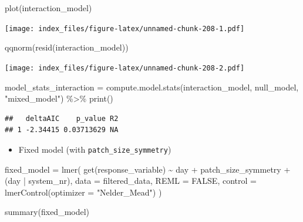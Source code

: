 \documentclass[
]{article}
\newenvironment{Shaded}{\begin{snugshade}}{\end{snugshade}}
\newcommand{\AttributeTok}[1]{\textcolor[rgb]{0.77,0.63,0.00}{#1}}
\newcommand{\ConstantTok}[1]{\textcolor[rgb]{0.00,0.00,0.00}{#1}}
\newcommand{\FunctionTok}[1]{\textcolor[rgb]{0.00,0.00,0.00}{#1}}
\newcommand{\NormalTok}[1]{#1}
\newcommand{\OtherTok}[1]{\textcolor[rgb]{0.56,0.35,0.01}{#1}}
\newcommand{\SpecialCharTok}[1]{\textcolor[rgb]{0.00,0.00,0.00}{#1}}
\newcommand{\StringTok}[1]{\textcolor[rgb]{0.31,0.60,0.02}{#1}}
\providecommand{\tightlist}{%
  \setlength{\itemsep}{0pt}\setlength{\parskip}{0pt}}
\begin{document}
\begin{Shaded}
\begin{Highlighting}[]
\FunctionTok{plot}\NormalTok{(interaction\_model)}
\end{Highlighting}
\end{Shaded}

\texttt{[image: index\_files/figure-latex/unnamed-chunk-208-1.pdf]}

\begin{Shaded}
\begin{Highlighting}[]
\FunctionTok{qqnorm}\NormalTok{(}\FunctionTok{resid}\NormalTok{(interaction\_model))}
\end{Highlighting}
\end{Shaded}

\texttt{[image: index\_files/figure-latex/unnamed-chunk-208-2.pdf]}

\begin{Shaded}
\begin{Highlighting}[]
\NormalTok{model\_stats\_interaction }\OtherTok{=} \FunctionTok{compute.model.stats}\NormalTok{(interaction\_model,}
\NormalTok{                                              null\_model,}
                                              \StringTok{"mixed\_model"}\NormalTok{) }\SpecialCharTok{\%\textgreater{}\%}
  \FunctionTok{print}\NormalTok{()}
\end{Highlighting}
\end{Shaded}

\begin{verbatim}
##   deltaAIC    p_value R2
## 1 -2.34415 0.03713629 NA
\end{verbatim}

\begin{itemize}
\tightlist
\item
  Fixed model (with \texttt{patch\_size\_symmetry})
\end{itemize}

\begin{Shaded}
\begin{Highlighting}[]
\NormalTok{fixed\_model }\OtherTok{=} \FunctionTok{lmer}\NormalTok{(}
  \FunctionTok{get}\NormalTok{(response\_variable) }\SpecialCharTok{\textasciitilde{}}
\NormalTok{    day }\SpecialCharTok{+} 
\NormalTok{    patch\_size\_symmetry }\SpecialCharTok{+} 
\NormalTok{    (day }\SpecialCharTok{|}\NormalTok{ system\_nr), }
  \AttributeTok{data =}\NormalTok{ filtered\_data,}
  \AttributeTok{REML =} \ConstantTok{FALSE}\NormalTok{,}
  \AttributeTok{control =} \FunctionTok{lmerControl}\NormalTok{(}\AttributeTok{optimizer =} \StringTok{"Nelder\_Mead"}\NormalTok{)}
\NormalTok{)}

\FunctionTok{summary}\NormalTok{(fixed\_model)}
\end{Highlighting}
\end{Shaded}
\end{document}
